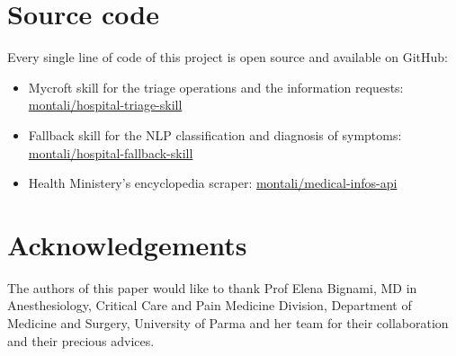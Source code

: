 \documentclass[conference]{IEEEtran}
\begin{document}
\section{Source code}
Every single line of code of this project is open source and available on GitHub:
\begin{itemize}
    \item Mycroft skill for the triage operations and the information requests: \href{https://github.com/montali/hospital-triage-skill}{montali/hospital-triage-skill}
    \item Fallback skill for the NLP classification and diagnosis of symptoms: \href{https://github.com/montali/hospital-fallback-skill}{montali/hospital-fallback-skill}
    \item Health Ministery's encyclopedia scraper: \href{https://github.com/montali/medical-infos-api}{montali/medical-infos-api}
\end{itemize}
\section{Acknowledgements}
\label{sec:acknowledgements}
The authors of this paper would like to thank Prof Elena Bignami, MD in Anesthesiology, Critical Care and Pain Medicine Division, Department of Medicine and Surgery, University of Parma and her team for their collaboration and their precious advices.
\end{document}
